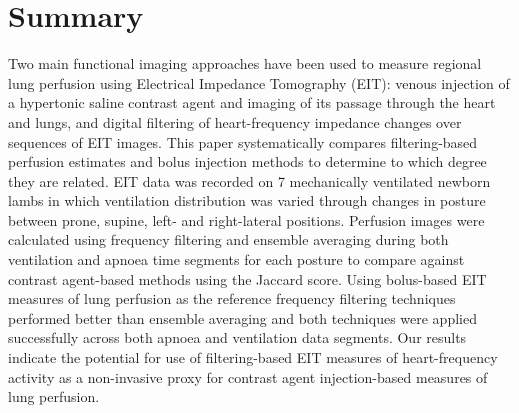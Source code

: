 \section{Summary}
    Two main functional imaging approaches have been used to measure regional lung perfusion 
    using Electrical Impedance Tomography (EIT): venous injection of a hypertonic saline contrast
    agent and imaging of its passage through the heart and lungs, and digital filtering 
    of heart-frequency impedance changes over sequences of EIT images.
    This paper systematically compares filtering-based perfusion estimates and 
    bolus injection methods to determine to which degree they are related.
    EIT data was recorded on 7 mechanically ventilated newborn lambs in which 
    ventilation distribution was varied through changes in posture
    between prone, supine, left- and right-lateral positions.
    Perfusion images were calculated using frequency filtering and ensemble averaging 
    during both ventilation and apnoea time segments for each posture to compare against 
    contrast agent-based methods using the Jaccard score. 
    Using bolus-based EIT measures of lung perfusion as the reference
    frequency filtering techniques performed better than ensemble averaging
    and both techniques were applied successfully across both apnoea and ventilation data segments.
    Our results indicate the potential for use of
    filtering-based EIT measures of heart-frequency activity as a non-invasive
    proxy for contrast agent injection-based measures of lung perfusion. 
